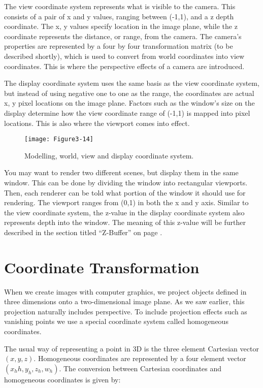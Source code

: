 The view coordinate system represents what is visible to the camera. This consists of a pair of x and y values, ranging between (-1,1), and a z depth coordinate. The x, y values specify location in the image plane, while the z coordinate represents the distance, or range, from the camera. The camera's properties are represented by a four by four transformation matrix (to be described shortly), which is used to convert from world coordinates into view coordinates. This is where the perspective effects of a camera are introduced.

The display coordinate system uses the same basis as the view coordinate system, but instead of using negative one to one as the range, the coordinates are actual x, y pixel locations on the image plane. Factors such as the window's size on the display determine how the view coordinate range of (-1,1) is mapped into pixel locations. This is also where the viewport comes into effect.

\begin{figure}[!htb]
  \centering
  \texttt{[image: Figure3-14]}\\
  \caption{ Modelling, world, view and display coordinate system.}\label{fig:Figure3-14}
\end{figure}

You may want to render two different scenes, but display them in the same window. This can be done by dividing the window into rectangular viewports. Then, each renderer can be told what portion of the window it should use for rendering. The viewport ranges from (0,1) in both the x and y axis. Similar to the view coordinate system, the z-value in the display coordinate system also represents depth into the window. The meaning of this z-value will be further described in the section titled ``Z-Buffer'' on page \pageref{Z-Buffer}.


\section{Coordinate Transformation}

When we create images with computer graphics, we project objects defined in three dimensions onto a two-dimensional image plane. As we saw earlier, this projection naturally includes perspective. To include projection effects such as vanishing points we use a special coordinate system called homogeneous coordinates.

The usual way of representing a point in 3D is the three element Cartesian vector $(x, y, z)$. Homogeneous coordinates are represented by a four element vector $( x_hh, y_h, z_h, w_h )$. The conversion between Cartesian coordinates and homogeneous coordinates is given by:

